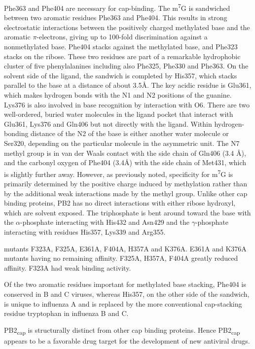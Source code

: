 \citep{1192} Phe363 and Phe404 are necessary for cap-binding. The m\textsuperscript{7}G is sandwiched between two aromatic residues Phe363 and Phe404. This results in strong electrostatic interactions between the positively charged methylated base and the aromatic $\pi$-electrons, giving up to 100-fold discrimination against a nonmethylated base. Phe404 stacks against the methylated base, and Phe323 stacks on the ribose. These two residues are part of a remarkable hydrophobic cluster of five phenylalanines including also Phe325, Phe330 and Phe363. On the solvent side of the ligand, the sandwich is completed by His357, which stacks parallel to the base at a distance of about 3.5\AA. The key acidic residue is Glu361, which makes hydrogen bonds with the N1 and N2 positions of the guanine. Lys376 is also involved in base recognition by interaction with O6. There are two well-ordered, buried water molecules in the ligand pocket that interact with Glu361, Lys376 and Gln406 but not directly with the ligand. Within hydrogen-bonding distance of the N2 of the base is either another water molecule or Ser320, depending on the particular molecule in the asymmetric unit. The N7 methyl group is in van der Waals contact with the side chain of Gln406 (3.4 \AA), and the carbonyl oxygen of Phe404 (3.4\AA) with the side chain of Met431, which is slightly further away. However, as previously noted, specificity for m\textsuperscript{7}G is primarily determined by the positive charge induced by methylation rather than by the additional weak interactions made by the methyl group. Unlike other cap binding proteins, PB2 has no direct interactions with either ribose hydroxyl, which are solvent exposed. The triphosphate is bent around toward the base with the $\alpha$-phosphate interacting with His432 and Asn429 and the $\gamma$-phosphate interacting with residues His357, Lys339 and Arg355.

mutants F323A, F325A, E361A, F404A, H357A and K376A. E361A and K376A mutants having no remaining affinity. F325A, H357A, F404A greatly reduced affinity. F323A had weak binding activity.

Of the two aromatic residues important for methylated base stacking, Phe404 is conserved in B and C viruses, whereas His357, on the other side of the sandwich, is unique to influenza A and is replaced by the more conventional cap-stacking residue tryptophan in influenza B and C.

PB2\textsubscript{cap} is structurally distinct from other cap binding proteins. Hence PB2\textsubscript{cap} appears to be a favorable drug target for the development of new antiviral drugs.

